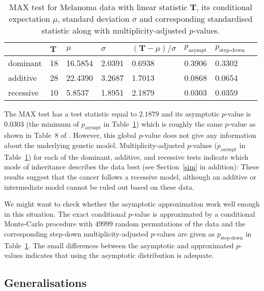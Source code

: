 \documentclass[bimj,fleqn]{w-art}
\newcommand{\T}{\mathbf{T}}
\begin{document}
\begin{table}
\begin{center}
\caption{MAX test for Melanoma data with linear statistic
         $\T$, its conditional expectation $\mu$, standard deviation 
         $\sigma$ and corresponding standardised statistic along with 
         multiplicity-adjusted $p$-values. \label{melres}}
\vspace*{0.5cm}
\begin{tabular}{l l l l l l l l}
 & $\T$ & $\mu$ & $ \sigma$ & $(\T - \mu) / \sigma$ & $p_\text{asympt}$ & $p_\text{step-down}$ \\ \hline
dominant  &  18 & 16.5854 & 2.0391 & 0.6938 & 0.3906 & 0.3302 \\ 
additive  &  28 & 22.4390 & 3.2687 & 1.7013 & 0.0868 & 0.0654 \\ 
recessive  &  10 & 5.8537 & 1.8951 & 2.1879 & 0.0303 & 0.0359 \\ \hline
\end{tabular}
\end{center}
\end{table}


The MAX test has a test statistic equal to 
$2.1879$  and its asymptotic $p$-value 
is 0.0303 (the minimum of $p_\text{asympt}$ in
Table~\ref{melres})
which is roughly the same $p$-value as shown in Table~8 of \citet{Freidlin:2002}.
However, this global $p$-value does not give any information about the
underlying genetic model. Multiplicity-adjusted $p$-values
($p_\text{asympt}$ in Table~\ref{melres})
for each of the dominant, additive, and recessive tests indicate
which mode of inheritance describes the data best
(see Section~\ref{sim} in addition):
These results suggest that the cancer follows a recessive model, although
an additive or intermediate model cannot be ruled out based on these data.

We might want to check whether the asymptotic approximation work well enough
in this situation. The exact conditional
$p$-value is approximated by a conditional Monte-Carlo procedure
with $49999$ random permutations of the data and the corresponding
step-down multiplicity-adjusted $p$-values \citep{WestfallYoung1993}
are given as $p_\text{step-down}$ in Table~\ref{melres}. The small
differences between the asymptotic and approximated $p$-values 
indicates that using the asymptotic distribution is adequate.

\subsection{Generalisations}
\end{document}
